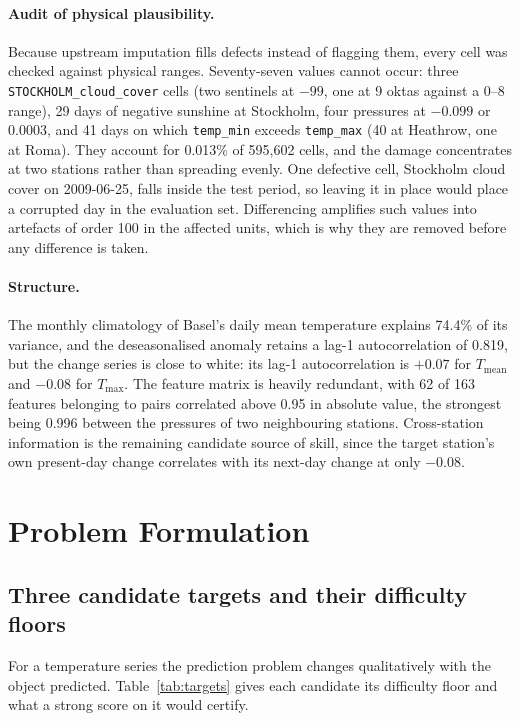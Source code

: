 \documentclass[11pt,a4paper]{article}
\begin{document}
\paragraph{Audit of physical plausibility.}
Because upstream imputation fills defects instead of flagging them, every cell was checked against physical ranges. Seventy-seven values cannot occur: three \texttt{STOCKHOLM\_cloud\_cover} cells (two sentinels at $-99$, one at 9 oktas against a 0--8 range), 29 days of negative sunshine at Stockholm, four pressures at $-0.099$ or $0.0003$, and 41 days on which \texttt{temp\_min} exceeds \texttt{temp\_max} (40 at Heathrow, one at Roma). They account for 0.013\% of 595{,}602 cells, and the damage concentrates at two stations rather than spreading evenly. One defective cell, Stockholm cloud cover on 2009-06-25, falls inside the test period, so leaving it in place would place a corrupted day in the evaluation set. Differencing amplifies such values into artefacts of order 100 in the affected units, which is why they are removed before any difference is taken.

\paragraph{Structure.}
The monthly climatology of Basel's daily mean temperature explains 74.4\% of its variance, and the deseasonalised anomaly retains a lag-1 autocorrelation of 0.819, but the change series is close to white: its lag-1 autocorrelation is $+0.07$ for $T_{\text{mean}}$ and $-0.08$ for $T_{\max}$. The feature matrix is heavily redundant, with 62 of 163 features belonging to pairs correlated above 0.95 in absolute value, the strongest being 0.996 between the pressures of two neighbouring stations. Cross-station information is the remaining candidate source of skill, since the target station's own present-day change correlates with its next-day change at only $-0.08$.

\section{Problem Formulation}
\label{sec:formulation}

\subsection{Three candidate targets and their difficulty floors}
\label{sec:targets}

For a temperature series the prediction problem changes qualitatively with the object predicted. Table~\ref{tab:targets} gives each candidate its difficulty floor and what a strong score on it would certify.
\end{document}
